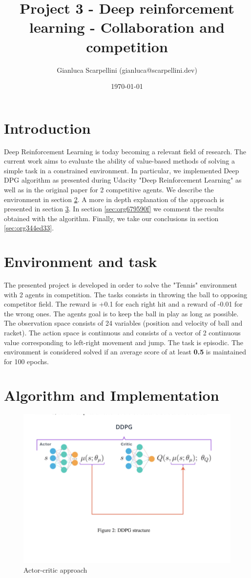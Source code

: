 \documentclass[11pt]{article}
\author{Gianluca Scarpellini (gianluca@scarpellini.dev)}
\date{\today}
\title{Project 3 - Deep reinforcement learning - Collaboration and competition}
\begin{document}
\maketitle
\tableofcontents


\section{Introduction}
\label{sec:orgcfa22a6}
Deep Reinforcement Learning is today becoming a relevant field of research. The
current work aims to evaluate the ability of value-based methods of solving a
simple task in a constrained environment. In particular, we implemented Deep DPG
algorithm as presented during Udacity "Deep Reinforcement Learning" as well as
in the original paper for 2 competitive agents. We describe the environment in
section \ref{sec:org5ff204a}. A more in depth explanation of the approach is
presented in section \ref{sec:orgcd4bf78}. In section \ref{sec:org679590f} we comment the
results obtained with the algorithm. Finally, we take our conclusions in section
\ref{sec:org344ed33}.


\section{Environment and task}
\label{sec:org5ff204a}
The presented project is developed in order to solve the "Tennis" environment
with 2 agents in competition. The tasks consists in throwing the ball to
opposing competitor field. The reward is +0.1 for each right hit and a reward
of -0.01 for the wrong ones. The agents goal is to keep the ball in play as long
as possible. The observation space consists of 24 variables (position and
velocity of ball and racket). The action space is continuous and consists of a
vector of 2 continuous value corresponding to left-right movement and jump. The
task is episodic. The environment is considered solved if an average score of at
least \textbf{0.5} is maintained for 100 epochs.

\section{Algorithm and Implementation}
\label{sec:orgcd4bf78}
\begin{figure}[htbp]
\centering
\includegraphics[width=.9\linewidth]{../contents/agentcritic.png}
\caption{\label{fig:orgb8e6bfa}Actor-critic approach}
\end{figure}
\end{document}
